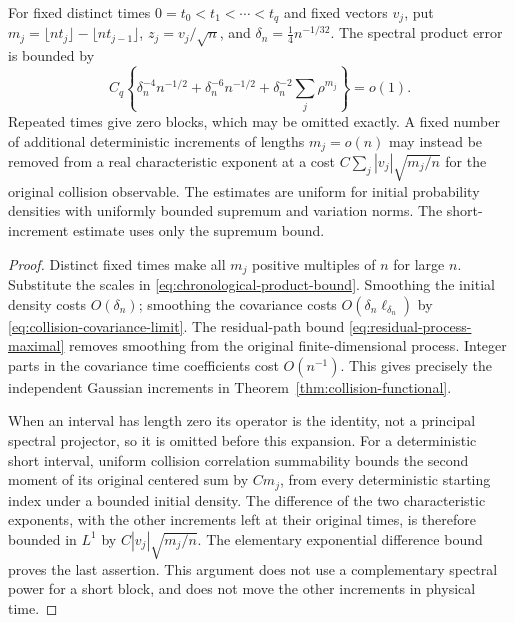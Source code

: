 \begin{corollary}
\label{cor:finite-dimensional-details}
For fixed distinct times $0=t_0<t_1<\cdots<t_q$ and fixed vectors
$v_j$, put
$m_j=\lfloor nt_j\rfloor-\lfloor nt_{j-1}\rfloor$,
$z_j=v_j/\sqrt n$, and $\delta_n=\tfrac14n^{-1/32}$.
The spectral product error is bounded by
\[
 C_q\left\{\delta_n^{-4}n^{-1/2}
             +\delta_n^{-6}n^{-1/2}
             +\delta_n^{-2}\sum_j\rho^{m_j}\right\}=o(1).
\]
Repeated times give zero blocks, which may be omitted exactly. A fixed
number of additional deterministic increments of lengths $m_j=o(n)$
may instead be removed from a real characteristic exponent at a cost
$C\sum_j |v_j|\sqrt{m_j/n}$ for the original collision observable.
The estimates are uniform for initial probability densities with uniformly
bounded supremum and variation norms. The short-increment estimate uses
only the supremum bound.
\end{corollary}
\begin{proof}
Distinct fixed times make all $m_j$ positive multiples of $n$ for
large $n$. Substitute the scales in
\eqref{eq:chronological-product-bound}. Smoothing the initial density
costs $O(\delta_n)$; smoothing the covariance costs
$O(\delta_n\ell_{\delta_n})$ by
\eqref{eq:collision-covariance-limit}. The residual-path bound
\eqref{eq:residual-process-maximal} removes smoothing from the original
finite-dimensional process. Integer parts in the covariance time
coefficients cost $O(n^{-1})$. This gives precisely the independent
Gaussian increments in Theorem~\ref{thm:collision-functional}.

When an interval has length zero its operator is the identity, not a
principal spectral projector, so it is omitted before this expansion.
For a deterministic short interval, uniform collision correlation
summability bounds the second moment of its original centered sum by
$Cm_j$, from every deterministic starting index under a bounded
initial density. The difference of the two characteristic exponents,
with the other increments left at their original times, is therefore
bounded in $L^1$ by $C|v_j|\sqrt{m_j/n}$. The elementary exponential
difference bound proves the last assertion. This argument does not
use a complementary spectral power for a short block, and does not
move the other increments in physical time.
\end{proof}

